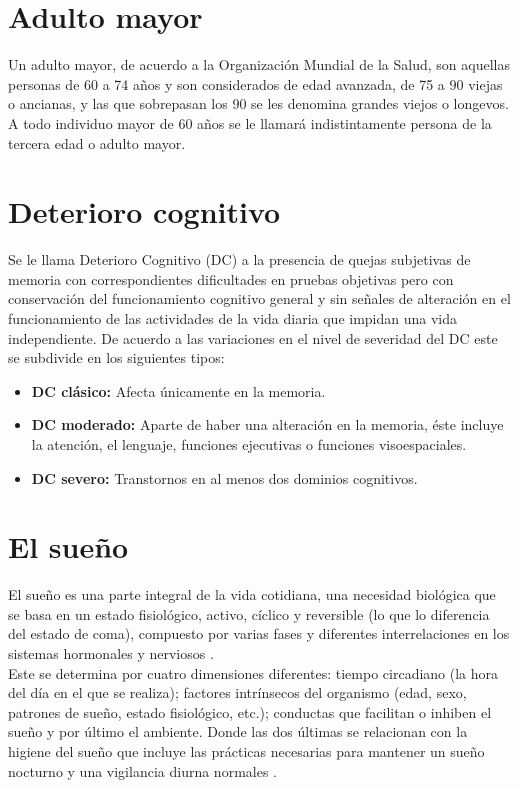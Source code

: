 \documentclass[letterpaper,titlepage,12pt,draft]{report}
\begin{document}
\section{Adulto mayor}
Un adulto mayor, de acuerdo a la Organizaci\'on Mundial de la Salud, son aquellas personas de 60 a 74 a\~nos y son considerados de edad avanzada, de 75 a 90 viejas o ancianas, y las que sobrepasan los 90 se les denomina grandes viejos o longevos. A todo individuo mayor de 60 a\~nos se le llamar\'a indistintamente persona de la tercera edad o adulto mayor.


\section{Deterioro cognitivo}

Se le llama Deterioro Cognitivo (DC) a la presencia de quejas subjetivas de memoria con correspondientes dificultades en pruebas objetivas pero con conservaci\'on del funcionamiento cognitivo general y sin se\~nales de alteraci\'on en el funcionamiento de las actividades de la vida diaria que impidan una vida independiente\cite{DC}. De acuerdo a las variaciones en el nivel de severidad del DC este se subdivide en los siguientes tipos:

\begin{itemize}
\item {\bf DC cl\'asico:} Afecta \'unicamente en la memoria.
\item {\bf DC moderado:} Aparte de haber una alteraci\'on en la memoria, \'este incluye la atenci\'on, el lenguaje, funciones ejecutivas o funciones visoespaciales.
\item {\bf DC severo:} Transtornos en al menos dos dominios cognitivos.
\end{itemize}


\section{El sue\~no}

El sue\~no es una parte integral de la vida cotidiana, una necesidad biol\'ogica que se basa en un estado fisiol\'ogico, activo, c\'iclico y reversible (lo que lo diferencia del estado de coma), compuesto por varias fases y diferentes interrelaciones en los sistemas hormonales y nerviosos \cite{Conde}.\\

Este se determina por cuatro dimensiones diferentes: tiempo circadiano (la hora del d\'ia en el que se realiza); factores intr\'insecos del organismo (edad, sexo, patrones de sue\~no, estado fisiol\'ogico, etc.); conductas que facilitan o inhiben el sue\~no y por \'ultimo el ambiente. Donde las dos \'ultimas se relacionan con la higiene del sue\~no que incluye las pr\'acticas necesarias para mantener un sue\~no nocturno y una vigilancia diurna normales \cite{Sierra}.\\
\end{document}

